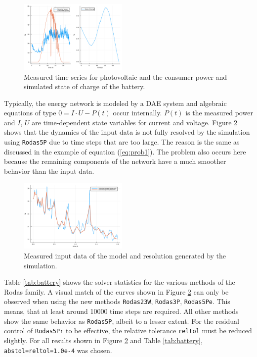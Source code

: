 \documentclass{juliacon}
\begin{document}
\begin{figure}
 \centering
 \includegraphics[width=0.47\textwidth]{Abb6a.pdf}
 \caption{Measured time series for photovoltaic and the consumer power and simulated state of charge of the battery.}\label{fig:energy}
\end{figure}

Typically, the energy network is modeled by a DAE system and algebraic equations of type $0 = I \cdot U - P(t)$ occur internally. $P(t)$ is the measured power and $I$, $U$ are time-dependent state 
variables for current and voltage.
Figure \ref{fig:energy1} shows that the dynamics of the input data is not fully resolved by the simulation using \verb|Rodas5P| due to time steps that are too large.
The reason is the same as discussed in the example of equation (\ref{eq:prob1}).
The problem also occurs here because the remaining components of the network have a much smoother behavior than the input data.

\begin{figure}
 \centering
 \includegraphics[width=0.47\textwidth]{Abb6b.pdf}
 \caption{Measured input data of the model and resolution generated by the simulation.}\label{fig:energy1}
\end{figure}

Table \ref{tab:battery} shows the solver statistics for the various methods of the Rodas family. A visual match of the curves shown in Figure \ref{fig:energy1} 
can only be observed when using the new methods \verb|Rodas23W|, \verb|Rodas3P|, \verb|Rodas5Pe|. 
This means, that at least around 10000 time steps are required.
All other methods show the same behavior as \verb|Rodas5P|, albeit to a lesser extent. For the residual control of \verb|Rodas5Pr| to be effective, 
the relative tolerance \verb|reltol| must be reduced slightly. For all results shown in Figure \ref{fig:energy1} and Table \ref{tab:battery}, \verb|abstol=reltol=1.0e-4| was chosen.
\end{document}
